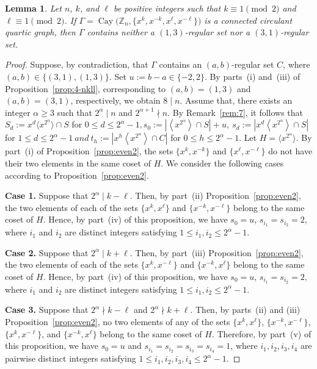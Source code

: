 \documentclass[12pt]{article}
\newtheorem{lemA}[propA]{Lemma}
\begin{document}
\begin{lemA}\label{lem:noregular}
 Let $n$, $k$, and $\ell$ be positive integers such that
 $k\equiv1\pmod{2}$ and $\ell\equiv1\pmod{2}$. If
 $
 \Gamma=\operatorname{Cay}\big(\mathbb{Z}_n,
 \{x^k,x^{-k},x^\ell,x^{-\ell}\}\big)
 $
 is a connected circulant quartic graph, then $\Gamma$ contains neither a
 $(1,3)$-regular set nor a $(3,1)$-regular set.
\end{lemA}
\begin{proof}
Suppose, by contradiction, that $\Gamma$ contains an $(a,b)$-regular
set $C$, where
$
(a,b)\in\{(3,1),(1,3)\}.
$
Set $u:=b-a\in\{-2,2\}$. By parts~(i) and~(iii) of
Proposition~\ref{prop:4-nkll}, corresponding to $(a,b)=(1,3)$ and
$(a,b)=(3,1)$, respectively, we obtain $8\mid n.$  Assume that, there exists an integer \(\alpha\ge 3\) such that
$
2^{\alpha}\mid n$
and
$2^{\alpha+1}\nmid n.$ By Remark~\ref{rem:7}, it follows that $ S_d := x^d \langle x^{2^{\alpha}} \rangle \cap S$ for $ 0 \le d \le 2^{\alpha}-1, s_0:=\left|\left\langle x^{2^{\alpha}}\right\rangle\cap S\right|+u,\ 	s_d:=\left|x^d\left\langle x^{2^{\alpha}}\right\rangle\cap S\right| $ for $ 1\le d\le 2^{\alpha}-1\ and\ t_h:=\left|x^h\left\langle x^{2^{\alpha}}\right\rangle\cap C\right|$ for $0\le h\le 2^{\alpha}-1.$ Let
$
H=\langle x^{2^{\alpha}}\rangle.$ By part~(i) of Proposition~\ref{prop:even2}, the sets $\{x^k,x^{-k}\}$ and $\{x^\ell,x^{-\ell}\}$ do not have their two elements in the same coset of $H$. We consider the following cases according to Proposition~\ref{prop:even2}.

\textbf{Case 1.} Suppose that $2^\alpha\mid k-\ell$. Then, by part~(ii) Proposition~\ref{prop:even2}, the two elements of each of the sets $\{x^k,x^\ell\}$ and $\{x^{-k},x^{-\ell}\}$ belong to the same coset of $H$. Hence, by part~(iv) of this proposition, we have $s_0=u$, $s_{i_1}=s_{i_2}=2$, where $i_1$ and $i_2$ are distinct integers satisfying $1\le i_1,i_2\le 2^\alpha-1$.

\textbf{Case 2.} Suppose that $2^\alpha\mid k+\ell$. Then, by part~(iii) Proposition~\ref{prop:even2}, the two elements of each of the sets $\{x^k,x^{-\ell}\}$ and $\{x^{-k},x^\ell\}$ belong to the same coset of $H$. Hence, by part~(iv) of this proposition, we have $s_0=u$, $s_{i_1}=s_{i_2}=2$, where $i_1$ and $i_2$ are distinct integers satisfying $1\le i_1,i_2\le 2^\alpha-1$.

\textbf{Case 3.} Suppose that $2^\alpha\nmid k-\ell$ and $2^\alpha\nmid k+\ell$. Then, by parts~(ii) and (iii) Proposition~\ref{prop:even2}, no two elements of any of the sets $\{x^k,x^\ell\}$, $\{x^{-k},x^{-\ell}\}$, $\{x^k,x^{-\ell}\}$, and $\{x^{-k},x^\ell\}$ belong to the same coset of $H$. Therefore, by part~(v) of this proposition, we have $s_0=u$ and $s_{i_1}=s_{i_2}=s_{i_3}=s_{i_4}=1$, where $i_1,i_2,i_3,i_4$ are pairwise distinct integers satisfying $1\le i_1,i_2,i_3,i_4\le 2^\alpha-1$.


\end{proof}
\end{document}
